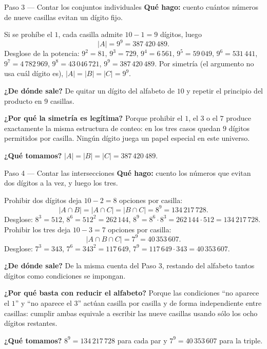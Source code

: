 \documentclass[11pt]{article}
\begin{document}
\begin{paso}{Paso 3 --- Contar los conjuntos individuales}
\textbf{Qué hago:} cuento cuántos números de nueve casillas evitan un dígito fijo.

Si se prohíbe el $1$, cada casilla admite $10-1=9$ dígitos, luego
\[
|A| = 9^{9} = 387\,420\,489 .
\]
Desglose de la potencia: $9^2=81$, $9^3=729$, $9^4=6\,561$, $9^5=59\,049$, $9^6=531\,441$, $9^7=4\,782\,969$, $9^8=43\,046\,721$, $9^9=387\,420\,489$.
Por simetría (el argumento no usa cuál dígito es), $|A|=|B|=|C| = 9^9$.

\textbf{¿De dónde sale?} De quitar un dígito del alfabeto de $10$ y repetir el principio del producto en $9$ casillas.

\textbf{¿Por qué la simetría es legítima?} Porque prohibir el $1$, el $3$ o el $7$ produce exactamente la misma estructura de conteo: en los tres casos quedan $9$ dígitos permitidos por casilla. Ningún dígito juega un papel especial en este universo.

\textbf{¿Qué tomamos?} $|A|=|B|=|C|=387\,420\,489$.
\end{paso}

\begin{paso}{Paso 4 --- Contar las intersecciones}
\textbf{Qué hago:} cuento los números que evitan dos dígitos a la vez, y luego los tres.

Prohibir dos dígitos deja $10-2=8$ opciones por casilla:
\[
|A\cap B| = |A\cap C| = |B\cap C| = 8^{9} = 134\,217\,728 .
\]
Desglose: $8^3 = 512$, $8^6 = 512^2 = 262\,144$, $8^9 = 8^6\cdot 8^3 = 262\,144\cdot 512 = 134\,217\,728$.
Prohibir los tres deja $10-3=7$ opciones por casilla:
\[
|A\cap B\cap C| = 7^{9} = 40\,353\,607 .
\]
Desglose: $7^3=343$, $7^6=343^2=117\,649$, $7^9 = 117\,649\cdot 343 = 40\,353\,607$.

\textbf{¿De dónde sale?} De la misma cuenta del Paso 3, restando del alfabeto tantos dígitos como condiciones se impongan.

\textbf{¿Por qué basta con reducir el alfabeto?} Porque las condiciones ``no aparece el $1$'' y ``no aparece el $3$'' actúan casilla por casilla y de forma independiente entre casillas: cumplir ambas equivale a escribir las nueve casillas usando sólo los ocho dígitos restantes.

\textbf{¿Qué tomamos?} $8^9 = 134\,217\,728$ para cada par y $7^9 = 40\,353\,607$ para la triple.
\end{paso}
\end{document}
